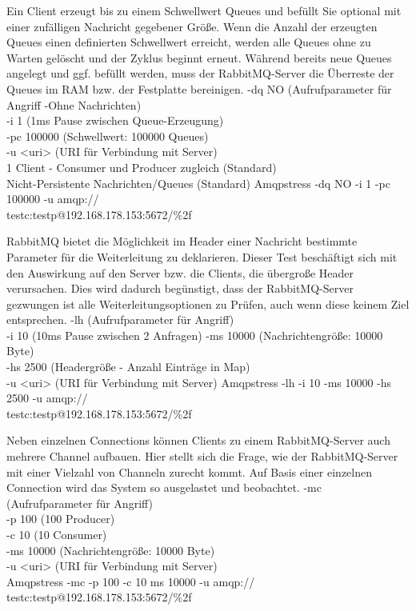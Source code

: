 \documentclass[	a4paper,
			11pt,
			oneside,
			parskip]{scrartcl}
\begin{document}
		{%
		 Ein Client erzeugt bis zu einem Schwellwert Queues und befüllt Sie optional mit einer zufälligen Nachricht gegebener Größe. Wenn die Anzahl der erzeugten Queues einen definierten Schwellwert erreicht,
		 werden alle Queues ohne zu Warten gelöscht und der Zyklus beginnt erneut. Während bereits neue Queues angelegt und ggf. befüllt werden, muss der RabbitMQ-Server die Überreste der Queues im RAM bzw.
		 der Festplatte bereinigen. 
		}{%
		 -dq NO (Aufrufparameter für Angriff -Ohne Nachrichten) \\
		 -i 1 (1ms Pause zwischen Queue-Erzeugung) \\
		 -pc 100000 (Schwellwert: 100000 Queues) \\
		 -u <uri> (URI für Verbindung mit Server) \\
		 1 Client - Consumer und Producer zugleich (Standard) \\
		 Nicht-Persistente Nachrichten/Queues (Standard)
		}{%
		 Amqpstress -dq NO -i 1 -pc 100000 -u amqp://\\\hspace*{3cm}testc:testp@192.168.178.153:5672/\%2f
		}
		
		
		
		{%
		 RabbitMQ bietet die Möglichkeit im Header einer Nachricht bestimmte Parameter für die Weiterleitung zu deklarieren. Dieser Test beschäftigt sich mit den Auswirkung auf den Server bzw. die Clients,
		 die übergroße Header verursachen. Dies wird dadurch begünstigt, dass der RabbitMQ-Server gezwungen ist alle Weiterleitungsoptionen zu Prüfen, auch wenn diese keinem Ziel entsprechen.
		}{%
		 -lh (Aufrufparameter für Angriff) \\
		 -i 10 (10ms Pause zwischen 2 Anfragen)
		 -ms 10000 (Nachrichtengröße: 10000 Byte) \\
		 -hs 2500 (Headergröße - Anzahl Einträge in Map) \\
		 -u <uri> (URI für Verbindung mit Server)
		}{%
		 Amqpstress -lh -i 10 -ms 10000 -hs 2500 -u amqp://\\\hspace*{3cm}testc:testp@192.168.178.153:5672/\%2f
		}

		
		{%
		 Neben einzelnen Connections können Clients zu einem RabbitMQ-Server auch mehrere Channel aufbauen. Hier stellt sich die Frage, wie der RabbitMQ-Server mit einer Vielzahl von Channeln zurecht kommt.
		 Auf Basis einer einzelnen Connection wird das System so ausgelastet und beobachtet.
		}{%
		 -mc (Aufrufparameter für Angriff) \\
		 -p 100 (100 Producer) \\
		 -c 10 (10 Consumer) \\
		 -ms 10000 (Nachrichtengröße: 10000 Byte) \\
		 -u <uri> (URI für Verbindung mit Server) \\		 
		}{%
		 Amqpstress -mc -p 100 -c 10 ms 10000 -u amqp://\\\hspace*{3cm}testc:testp@192.168.178.153:5672/\%2f
		}
\end{document}
